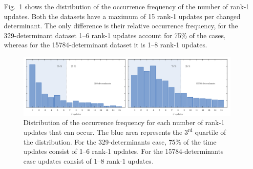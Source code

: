 \documentclass[11pt]{article}
\numberwithin{figure}{section}
\numberwithin{table}{section}
\begin{document}
			Fig.~\ref{fig:upd_freq} shows the distribution of the occurrence frequency of the number of rank-1 updates. Both the datasets have a maximum of 15 rank-1 updates per changed determinant. The only difference is their relative occurrence frequency, for the 329-determinant dataset 1--6 rank-1 updates account for 75\% of the cases, whereas for the 15784-determinant dataset it is 1--8 rank-1 updates. 
			
			\begin{figure}[h]
				\centering
				\includegraphics[width=1\textwidth]{upd_freq_hor.png}
				\caption{Distribution of the occurrence frequency for each number of rank-1 updates that can occur. The blue area represents the $3^\mathrm{rd}$ quartile of the distribution. For the 329-determinants case, 75\% of the time updates consist of 1--6 rank-1 updates. For the 15784-determinants case updates consist of 1--8 rank-1 updates.}
				\label{fig:upd_freq}
			\end{figure}	

		
\end{document}
